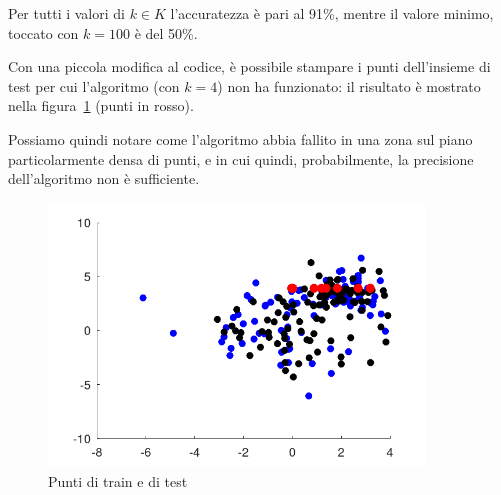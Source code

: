 \documentclass[a4paper]{article}
\begin{document}
Per tutti i valori di $k\in K$ l'accuratezza è pari al 91\%, mentre il valore minimo, toccato con $k=100$ è del 50\%.

Con una piccola modifica al codice, è possibile stampare i punti dell'insieme di test per cui l'algoritmo (con $k=4$) non ha funzionato: il risultato è mostrato nella figura~\ref{fig:sb} (punti in rosso).

Possiamo quindi notare come l'algoritmo abbia fallito in una zona sul piano particolarmente densa di punti, e in cui quindi, probabilmente, la precisione dell'algoritmo non è sufficiente.

\begin{figure}
\centering
\includegraphics[width=10cm]{puntisb}
\caption{Punti di train e di test}
\label{fig:sb}
\end{figure}
\end{document}
